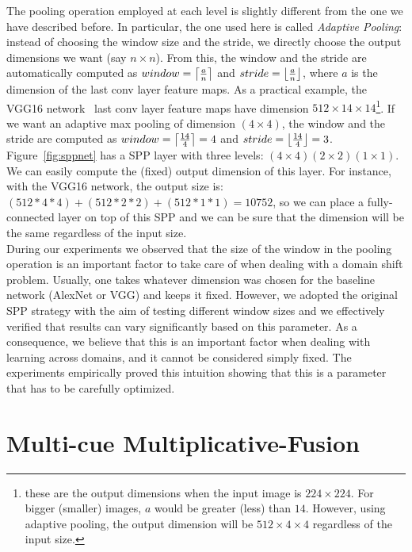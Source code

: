 \documentclass[../main.tex]{subfiles}
\begin{document}
    The pooling operation employed at each level is slightly different from the
    one we have described before. In particular, the one used here is called \textit{Adaptive Pooling}: instead of choosing the window size and the
    stride, we directly choose the output dimensions we want (say $n \times n$). From this, the window and the stride are automatically computed
    as $window = \ceil*{\frac{a}{n}}$ and $stride = \floor*{\frac{a}{n}}$, where $a$ is the dimension of the last conv layer feature maps. As a
    practical example, the VGG16 network~\cite{vgg16} last conv layer feature maps have dimension $512 \times 14 \times 14$\footnote{these are
    the output dimensions when the input image is $224 \times 224$. For bigger (smaller) images, $a$ would be greater (less) than $14$.
    However, using adaptive pooling, the output dimension will be $512 \times 4 \times 4$ regardless of the input size.}.
    If we want an adaptive max pooling of dimension $(4 \times 4)$, the window and the stride are computed as
    $window = \ceil*{\frac{14}{4}} = 4$ and $stride = \floor*{\frac{14}{4}} = 3$. Figure~\ref{fig:sppnet} has a SPP layer with three levels:
    $(4 \times 4) (2 \times 2) (1 \times 1)$. We can easily compute the (fixed) output dimension of this layer. For instance, with the VGG16
    network, the output size is: $(512*4*4) + (512*2*2) + (512*1*1) = 10752$, so we can place a fully-connected layer on top of this SPP and
    we can be sure that the dimension will be the same regardless of the input size. \\

	During our experiments we observed that the size of the window in the pooling operation is an important factor to take care of
	when dealing with a domain shift problem. Usually, one takes whatever dimension was chosen for the baseline network (AlexNet or VGG)
	and keeps it fixed. However, we adopted the original SPP strategy with the aim of testing different window sizes and we effectively
	verified that results can vary significantly based on this parameter. As a consequence, we believe that this is an important factor
    when dealing with learning across domains, and it cannot be considered simply fixed. The experiments empirically proved this intuition
    showing that this is a parameter that has to be carefully optimized.

    \section{Multi-cue Multiplicative-Fusion}\label{sec:load-network}
\end{document}
